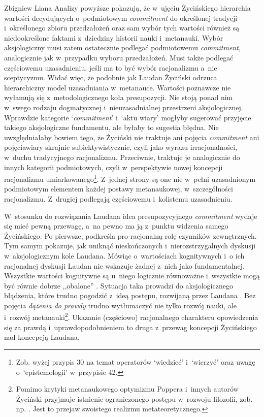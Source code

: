 \begin{artplenv}{Zbigniew Liana}
Analizy powyższe pokazują, że w~ujęciu Życińskiego hierarchia wartości decydujących o~podmiotowym \textit{commitment} do określonej tradycji i~określonego zbioru przedzałożeń oraz sam wybór tych wartości również są niedookreślone faktami z~dziedziny historii nauki i~metanauki. Wybór aksjologiczny musi zatem ostatecznie podlegać podmiotowemu \textit{commitment}, analogicznie jak w~przypadku wyboru przedzałożeń. Musi także podlegać częściowemu uzasadnieniu, jeśli ma to być wybór racjonalizmu a~nie sceptycyzmu. Widać więc, że podobnie jak Laudan Życiński odrzuca hierarchiczny model uzasadniania w~metanauce. Wartości poznawcze nie wyłamują się z~metodologicznego koła presupozycji. Nie stoją ponad nim w~swego rodzaju dogmatycznej i~nieuzasadnialnej przestrzeni aksjologicznej. Wprawdzie kategorie ‘\textit{commitment}' i~‘aktu wiary' mogłyby sugerować przyjęcie takiego aksjologiczne fundamentu, ale byłaby to sugestia błędna. Nie uwzględniałaby bowiem tego, że Życiński nie traktuje ani pojęcia \textit{commitment} ani pojęciawiary skrajnie subiektywistycznie, czyli jako wyrazu irracjonalności, w~duchu tradycyjnego racjonalizmu. Przeciwnie, traktuje je analogicznie do innych kategorii podmiotowych, czyli w~perspektywie nowej koncepcji racjonalizmu umiarkowanego\footnote{Zob. wyżej przypis 30 na temat operatorów ‘wiedzieć' i~‘wierzyć' oraz uwagę o~‘epistemologii' w~przypisie 42.}. Z~jednej strony są one nie w~pełni uzasadnionym podmiotowym elementem każdej postawy metanaukowej, w~szczególności racjonalizmu. Z~drugiej podlegają częściowemu i~kolistemu uzasadnieniu.

W~stosunku do rozwiązania Laudana idea presupozycyjnego \textit{commitment} wydaje się mieć pewną przewagę, a~na pewno ma ją z~punktu widzenia samego Życińskiego. Po pierwsze, podkreśla pro-racjonalną rolę czynników zewnętrznych. Tym samym pokazuje, jak uniknąć nieskończonych i~nierozstrzygalnych dyskusji w~aksjologicznym kole Laudana. Mówiąc o~wartościach kognitywnych i~o ich racjonalnej dyskusji Laudan nie wskazuje żadnej z~nich jako fundamentalnej. Wszystkie wartości kognitywne są u~niego logicznie równoważne i~wszystkie mogą być równie dobrze ,,obalone''
\parencite[zob.][s.~23]{grobler_prawda_1993}. %
 Sytuacja taka prowadzi do aksjologicznego błądzenia, które trudno pogodzić z~ideą postępu, rozwijaną przez Laudana 
\parencite[][s.~32–35]{grobler_prawda_1993}. %
 Bez pojęcia \textit{dążenia do prawdy} trudno wytłumaczyć nie tylko rozwój nauki, ale i~rozwój metanauki\footnote{Pomimo krytyki metanaukowego optymizmu Poppera i~innych autorów Życiński przyjmuje istnienie ograniczonego postępu w~rozwoju filozofii, zob. np. 
\parencite[][s.~47–53]{zycinski_teizm_1988}. %
 Jest to przejaw swoistego realizmu metateoretycznego.}. Ukazanie (częściowo) racjonalnego charakteru opowiedzenia się za prawdą i~uprawdopodobnieniem to druga z~przewag koncepcji Życińskiego nad koncepcją Laudana.


\end{artplenv}
